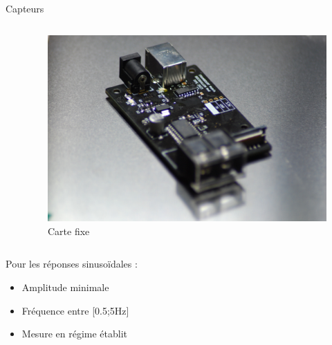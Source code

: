 \documentclass{beamer}
\begin{document}
\begin{frame}{Capteurs}
\begin{columns}
\begin{column}{0.35\textwidth}
			\end{column}
			\begin{column}{0.35\textwidth}
				\begin{figure}
					\includegraphics[width=\textwidth]{Image/Carte fixe belle photo.JPG}
					\caption{Carte fixe}
				\end{figure}
			\end{column}
		\end{columns}
	
	\end{frame}
	


	
	\begin{frame}
		Pour les réponses sinusoïdales : 
		\begin{itemize}
			\item Amplitude minimale
			\item Fréquence entre [0.5;5Hz]
			\item Mesure en régime établit 
		\end{itemize}
	\end{frame}
	
\end{document}
